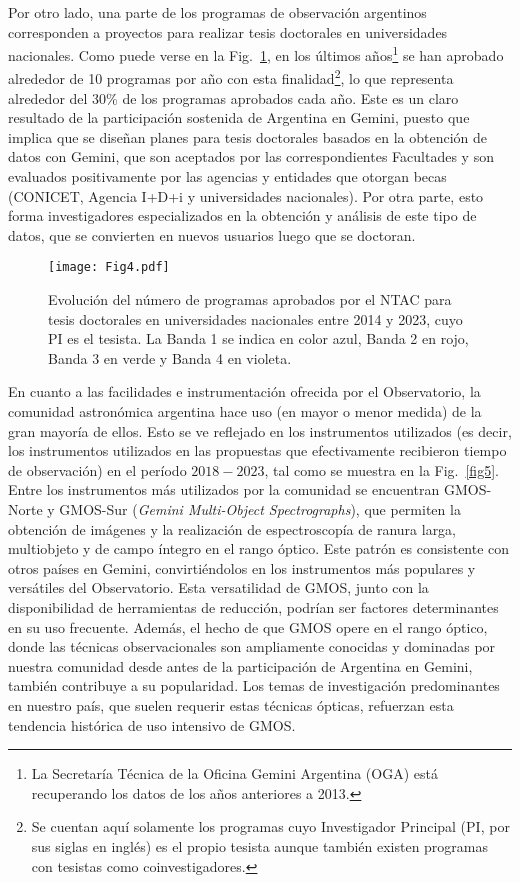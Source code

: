 \documentclass[baaa]{baaa}
\begin{document}
Por otro lado, una parte de los programas de observación argentinos corresponden a proyectos para realizar tesis doctorales en universidades nacionales. Como puede verse en la Fig.~\ref{fig4}, en los últimos años\footnote{La Secretaría Técnica de la Oficina Gemini Argentina (OGA) está recuperando los datos de los años anteriores a 2013.} se han aprobado alrededor de 10 programas por año con esta finalidad\footnote{Se cuentan aquí solamente los programas cuyo Investigador Principal (PI, por sus siglas en inglés) es el propio tesista aunque también existen programas con tesistas como coinvestigadores.}, lo que representa alrededor del 30\% de los programas aprobados cada año. Este es un claro resultado de la participación sostenida de Argentina en Gemini, puesto que implica que se diseñan planes para tesis doctorales basados en la obtención de datos con Gemini, que son aceptados por las correspondientes Facultades y son evaluados positivamente por las agencias y entidades que otorgan becas (CONICET, Agencia I+D+i y universidades nacionales). Por otra parte, esto forma investigadores especializados en la obtención y análisis de este tipo de datos, que se convierten en nuevos usuarios luego que se doctoran.\\

\begin{figure}[!t]
\centering
\texttt{[image: Fig4.pdf]}
\caption{Evolución del número de programas aprobados por el NTAC para tesis doctorales en universidades nacionales entre 2014 y 2023, cuyo PI es el tesista. La Banda 1 se indica en color azul, Banda 2 en rojo, Banda 3 en verde y Banda 4 en violeta.}
\label{fig4}
\end{figure}

En cuanto a las facilidades e instrumentación ofrecida por el Observatorio, la comunidad astronómica argentina hace uso (en mayor o menor medida) de la gran mayoría de ellos. Esto se ve reflejado en los instrumentos utilizados (es decir, los instrumentos utilizados en las propuestas que efectivamente recibieron tiempo de observación) en el período $2018-2023$, tal como se muestra en la Fig.~\ref{fig5}. Entre los instrumentos más utilizados por la comunidad se encuentran GMOS-Norte y GMOS-Sur ({\em Gemini Multi-Object Spectrographs}), que permiten la obtención de imágenes y la realización de espectroscopía de ranura larga, multiobjeto y de campo íntegro en el rango óptico. Este patrón es consistente con otros países en Gemini, convirtiéndolos en los instrumentos más populares y versátiles del Observatorio.
Esta versatilidad de GMOS, junto con la disponibilidad de herramientas de reducción, podrían ser factores determinantes en su uso frecuente. Además, el hecho de que GMOS opere en el rango óptico, donde las técnicas observacionales son ampliamente conocidas y dominadas por nuestra comunidad desde antes de la participación de Argentina en Gemini, también contribuye a su popularidad. Los temas de investigación predominantes en nuestro país, que suelen requerir estas técnicas ópticas, refuerzan esta tendencia histórica de uso intensivo de GMOS.
\end{document}
